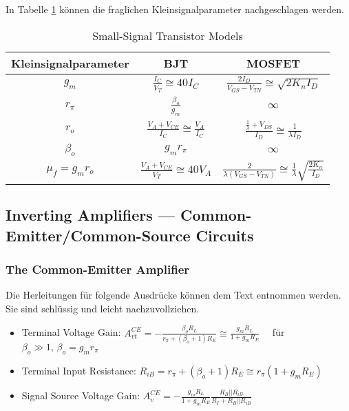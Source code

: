 \documentclass[11pt,a4paper,titlepage]{article}
\begin{document}
In Tabelle \ref{tab:Kleinsignalparameter} können die fraglichen Kleinsignalparameter nachgeschlagen werden.
\begin{table}[h!]
	\caption{Small-Signal Transistor Models}
	\centering
	\begin{tabular}{ccc}
		\toprule
		\textbf{Kleinsignalparameter}				&\textbf{BJT} &\textbf{MOSFET}	\\
		\midrule
		$g_m$		        &$\frac{I_C}{V_T} \cong 40I_C$				& $\frac{2I_D}{V_{GS} - V_{TN}} \cong \sqrt{2K_nI_D}$ \\
		$r_{\pi}$		    &$\frac{\beta_o}{g_m}$			& $\infty$ \\
		$r_o$		        &$\frac{V_A + V_{CE}}{I_C} \cong \frac{V_A}{I_C}$			& $\frac{\frac{1}{\lambda}+V_{DS}}{I_D} \cong \frac{1}{\lambda I_D}$ \\
		$\beta_o$		    &$g_mr_{\pi}$	&	$\infty$	\\
		$\mu_f = g_mr_o$	&$\frac{V_A + V_{CE}}{V_T} \cong 40V_A$		& $\frac{2}{\lambda(V_{GS}-V_{TN})} \cong \frac{1}{\lambda}\sqrt{\frac{2K_n}{I_D}}$		\\
		\bottomrule
	\end{tabular}
	\label{tab:Kleinsignalparameter} 
\end{table}

\subsection{Inverting Amplifiers — Common-Emitter/Common-Source Circuits}
\subsubsection{The Common-Emitter Amplifier}
Die Herleitungen für folgende Ausdrücke können dem Text entnommen werden. Sie sind schlüssig und leicht nachzuvollziehen.
\begin{itemize}
	\item Terminal Voltage Gain: $A_{vt}^{CE} = - \frac{\beta_oR_L}{r_{\pi}+(\beta_o+1)R_E} \cong \frac{g_mR_L}{1+g_mR_E} \quad$ für $\beta_o \gg 1, \, \beta_o=g_mr_{\pi}$
	\item Terminal Input Resistance: $R_{iB} = r_{\pi} + (\beta_o + 1)R_E \cong r_{\pi}(1+g_mR_E)$
	\item Signal Source Voltage Gain: $A_v^{CE} = - \frac{g_mR_L}{1+g_mR_E}\frac{R_B||R_{iB}}{R_I + R_B||R_{iB}}$
\end{itemize}
\end{document}
